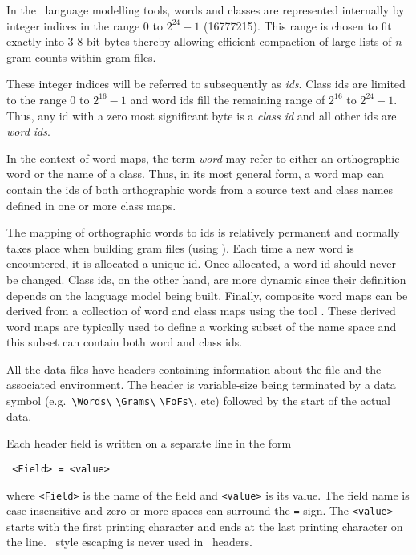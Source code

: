 
In the \HTK\ language modelling tools, words and classes are
represented internally by integer indices in the range 0 to $2^{24} -
1$ (16777215).  This range is chosen to fit exactly into 3 8-bit bytes
thereby allowing efficient compaction of large lists of $n$-gram counts
within gram files.

These integer indices will be referred to subsequently as
\textit{ids}.  Class ids are limited to the range 0 to $2^{16}-1$ and
word ids fill the remaining range of $2^{16}$ to $2^{24} - 1$.  Thus,
any id with a zero most significant byte is a \textit{class id} and
all other ids are
\textit{word ids}.

In the context of word maps, the term \textit{word} may refer to
either an orthographic word or the name of a class.  Thus, in its most
general form, a word map can contain the ids of both orthographic
words from a source text and class names defined in one or more class
maps.

The mapping of orthographic words to ids is relatively permanent and
normally takes place when building gram files (using ).
Each time a new word is encountered, it is allocated a unique id.
Once allocated, a word id should never be changed. Class ids, on the
other hand, are more dynamic since their definition depends on the
language model being built.  Finally, composite word maps can be
derived from a collection of word and class maps using the tool
.  These derived word maps are typically used to define a
working subset of the name space and this subset can contain both word
and class ids.


All the data files have headers containing information about the
file and the associated environment.  The header is variable-size
being terminated by a data symbol (e.g.\ \verb+\Words\+ \verb+\Grams\+
\verb+\FoFs\+, etc) followed by the start of the actual data.

Each header field is written on a separate line in the
form
\begin{verbatim}
 <Field> = <value>
\end{verbatim}
where \texttt{<Field>} is the name of the field and \texttt{<value>}
is its value.  The field name is case insensitive and zero or more
spaces can surround the \texttt{=} sign.  The \texttt{<value>} starts
with the first printing character and ends at the last printing
character on the line.  \HTK\ style escaping is never used in \HLM\
headers.

